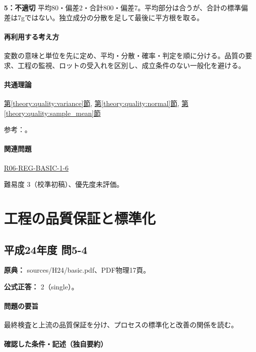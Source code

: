 \noindent\textbf{5：不適切} 平均80・偏差2・合計800・偏差7。平均部分は合うが、合計の標準偏差は7gではない。独立成分の分散を足して最後に平方根を取る。\par

\paragraph{再利用する考え方} 変数の意味と単位を先に定め、平均・分散・確率・判定を順に分ける。品質の要求、工程の監視、ロットの受入れを区別し、成立条件のない一般化を避ける。

\paragraph{共通理論} \hyperref[theory:quality:variance]{第\ref*{theory:quality:variance}節}, \hyperref[theory:quality:normal]{第\ref*{theory:quality:normal}節}, \hyperref[theory:quality:sample_mean]{第\ref*{theory:quality:sample_mean}節}

\par 参考：\cite{stat_nist_normal,stat_psu_linear}。

\paragraph{関連問題} \hyperref[q:r06-reg-basic-1-6]{R06-REG-BASIC-1-6}

\par 難易度 3（校準初稿）、優先度未評価。

\section{工程の品質保証と標準化}

\subsection{平成24年度 問5-4}
\label{q:h24-reg-basic-5-4}

\noindent\textbf{原典：} sources/H24/basic.pdf、PDF物理17頁。

\textbf{公式正答：} 2（single）。

\paragraph{問題の要旨} 最終検査と上流の品質保証を分け、プロセスの標準化と改善の関係を読む。

\paragraph{確認した条件・記述（独自要約）}\mbox{}\par

